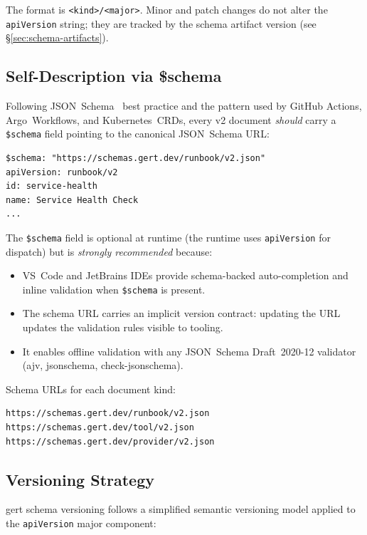 The format is \texttt{<kind>/<major>}.  Minor and patch changes do not alter
the \texttt{apiVersion} string; they are tracked by the schema artifact version
(see \S\ref{sec:schema-artifacts}).

\subsection{Self-Description via \$schema}
\label{subsec:self-description}

Following JSON~Schema~\cite{jsonschema-spec} best practice and the pattern used by GitHub Actions,
Argo~Workflows, and Kubernetes~CRDs, every v2 document \emph{should} carry a
\texttt{\$schema} field pointing to the canonical JSON~Schema URL:

\begin{verbatim}
$schema: "https://schemas.gert.dev/runbook/v2.json"
apiVersion: runbook/v2
id: service-health
name: Service Health Check
...
\end{verbatim}

The \texttt{\$schema} field is optional at runtime (the runtime uses
\texttt{apiVersion} for dispatch) but is \emph{strongly recommended} because:

\begin{itemize}
  \item VS~Code and JetBrains IDEs provide schema-backed auto-completion and
        inline validation when \texttt{\$schema} is present.
  \item The schema URL carries an implicit version contract: updating the URL
        updates the validation rules visible to tooling.
  \item It enables offline validation with any JSON~Schema Draft~2020-12
        validator (ajv, jsonschema, check-jsonschema).
\end{itemize}

Schema URLs for each document kind:

\begin{verbatim}
https://schemas.gert.dev/runbook/v2.json
https://schemas.gert.dev/tool/v2.json
https://schemas.gert.dev/provider/v2.json
\end{verbatim}

\subsection{Versioning Strategy}
\label{subsec:versioning-strategy}

gert schema versioning follows a simplified semantic versioning model applied
to the \texttt{apiVersion} major component:

